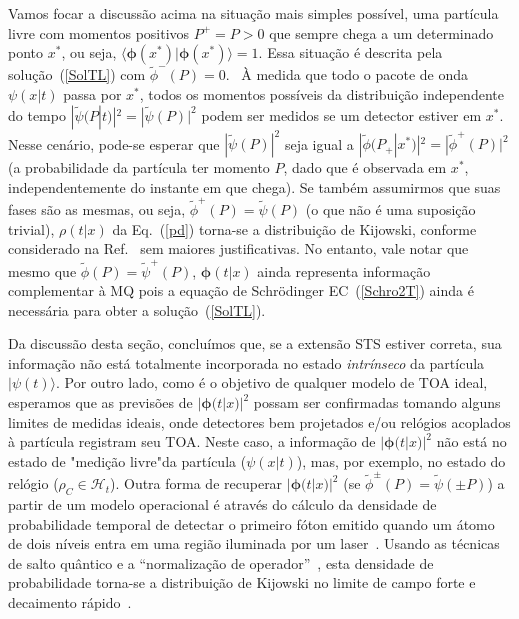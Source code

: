 Vamos focar a discussão acima na situação mais simples possível, uma partícula livre com momentos positivos $P^+=P>0$ que sempre chega a um determinado ponto $x^*$, ou seja, $\langle \pmb{\phi}(x^ *)|\pmb{\phi}(x^*)\rangle=1$. Essa situação é descrita pela solução~(\ref{SolTL}) com ${\tilde \phi}^-(P)=0$. ~À medida que todo o pacote de onda $\psi(x|t)$ passa por $x^*$, todos os momentos possíveis da distribuição independente do tempo $|{\tilde \psi}(P|t)|^2=| {\tilde \psi}(P)|^2$ podem ser medidos se um detector estiver em $x^*$. Nesse cenário, pode-se esperar que $|{\tilde \psi}(P)|^2$ seja igual a $|{\tilde \phi}(P_+|x^*)|^2=|{\tilde \phi}^+(P)|^2$ (a probabilidade da partícula ter momento $P$, dado que é observada em $x^*$, independentemente do instante em que chega). Se também assumirmos que suas fases são as mesmas, ou seja, ${\tilde \phi}^+(P)={\tilde \psi}(P)$ (o que não é uma suposição trivial), $\rho(t| x)$ da Eq.~(\ref{pd}) torna-se a distribuição de Kijowski, conforme considerado na Ref.~\cite{Dias} sem maiores justificativas. No entanto, vale notar que mesmo que ${\tilde \phi}(P)={\tilde \psi}^+(P)$, $\pmb{\phi}(t|x)$ ainda representa informação complementar à MQ pois a equação de Schrödinger EC~(\ref{Schro2T}) ainda é necessária para obter a solução~(\ref{SolTL}).

Da discussão desta seção, concluímos que, se a extensão STS estiver correta, sua informação não está totalmente incorporada no estado \textit{intrínseco} da partícula $|\psi(t)\rangle$. Por outro lado, como é o objetivo de qualquer modelo de TOA ideal, esperamos que as previsões de $|\pmb{\phi}(t|x)|^2$ possam ser confirmadas tomando alguns limites de medidas ideais, onde detectores bem projetados e/ou relógios acoplados à partícula registram seu TOA. Neste caso, a informação de $|\pmb{\phi}(t|x)|^2$ não está no estado de "medição livre"\text{ }da partícula ($\psi(x|t)$), mas, por exemplo, no estado do relógio ($\rho_C \in {\mathcal H}_t$). Outra forma de recuperar $|\pmb{\phi}(t|x)|^2$ (se ${\tilde \phi}^\pm(P)={\tilde \psi}(\pm P)$) a partir de um modelo operacional é através do cálculo da densidade de probabilidade temporal de detectar o primeiro fóton emitido quando um átomo de dois níveis entra em uma região iluminada por um laser~\cite{Damborenea}. Usando as técnicas de salto quântico e a ``normalização de operador''~\cite{Brunetti}, esta densidade de probabilidade torna-se a distribuição de Kijowski no limite de campo forte e decaimento rápido~\cite{Heger}.







